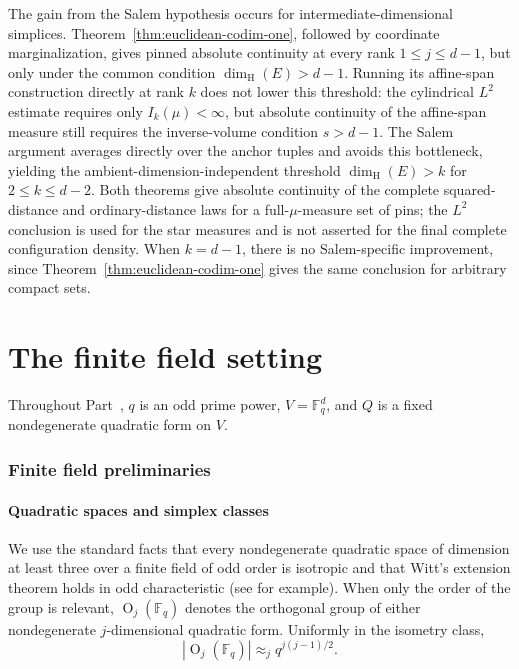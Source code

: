 \documentclass[11pt]{article}
\theoremstyle{remark}
\numberwithin{equation}{section}
\newcommand{\Fq}{\mathbb F_q}
\newcommand{\Orth}{\operatorname O}
\newcommand{\1}{\mathbf 1}
\begin{document}
The gain from the Salem hypothesis occurs for intermediate-dimensional
simplices.  Theorem~\ref{thm:euclidean-codim-one}, followed by
coordinate marginalization, gives pinned absolute continuity at every
rank \(1\leq j\leq d-1\), but only under the common condition
\(\dim_{\mathrm H}(E)>d-1\).  Running its affine-span construction
directly at rank \(k\) does not lower this threshold: the cylindrical
\(L^2\) estimate requires only \(I_k(\mu)<\infty\), but absolute
continuity of the affine-span measure still requires the
inverse-volume condition \(s>d-1\).  The Salem argument averages
directly over the anchor tuples and avoids this bottleneck, yielding
the ambient-dimension-independent threshold
\(\dim_{\mathrm H}(E)>k\) for \(2\leq k\leq d-2\).  Both theorems give
absolute continuity of the complete squared-distance and
ordinary-distance laws for a full-\(\mu\)-measure set of pins; the
\(L^2\) conclusion is used for the star measures and is not asserted
for the final complete configuration density.  When \(k=d-1\), there
is no Salem-specific improvement, since
Theorem~\ref{thm:euclidean-codim-one} gives the same conclusion for
arbitrary compact sets.  









\part{The finite field setting}
\label{part:finite-field}

Throughout Part~\ref{part:finite-field}, \(q\) is an odd prime power,  \(V=\Fq^d\), and \(Q\) is a fixed nondegenerate quadratic form on \(V\).

\section{Finite field preliminaries}
\label{sec:finite-preliminaries}

\subsection{Quadratic spaces and simplex classes}

We use the standard facts that every nondegenerate quadratic space of dimension at least three over a finite field of odd order is isotropic and that Witt's extension theorem holds in odd characteristic (see \cite[Section 7]{BHIPR} for
example).  When only the order of the group is relevant, \(\Orth_j(\Fq)\) denotes the orthogonal group of either nondegenerate \(j\)-dimensional quadratic form. Uniformly in the isometry class,
\begin{equation}\label{eq:orthogonal-size}
|\Orth_j(\Fq)|\approx_j q^{j(j-1)/2}.
\end{equation}
\end{document}

